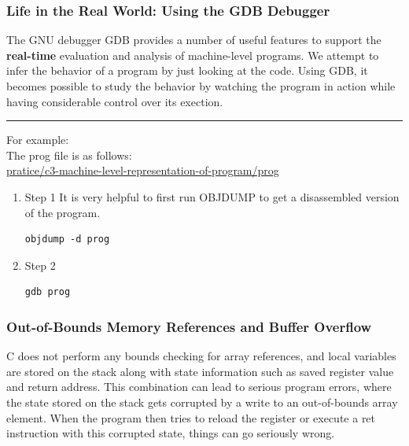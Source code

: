 \documentclass[11pt]{article}
\begin{document}
\subsubsection{Life in the Real World: Using the GDB Debugger}
\label{sec:orgc778cd2}
The GNU debugger GDB provides a number of useful features to support the \textbf{real-time} evaluation and analysis of machine-level programs. We attempt to infer the behavior of a program by just looking at the code. Using GDB, it becomes possible to study the behavior by watching the program in action while having considerable control over its exection.\\






\noindent\rule{\textwidth}{0.5pt}
For example:\\
The prog file is as follows:\\
\url{pratice/c3-machine-level-representation-of-program/prog}\\

\begin{enumerate}
\item Step 1
\label{sec:org5904fac}
It is very helpful to first run OBJDUMP to get a disassembled version of the program.\\
\begin{verbatim}
objdump -d prog
\end{verbatim}

\item Step 2
\label{sec:org1c5af53}
\begin{verbatim}
gdb prog
\end{verbatim}
\end{enumerate}

\subsubsection{Out-of-Bounds Memory References and Buffer Overflow}
\label{sec:org8db2713}
C does not perform any bounds checking for array references, and local variables are stored on the stack along with state information such as saved register value and return address. This combination can lead to serious program errors, where the state stored on the stack gets corrupted by a write to an out-of-bounds array element. When the program then tries to reload the register or execute a ret instruction with this corrupted state, things can go seriously wrong.\\
\end{document}
